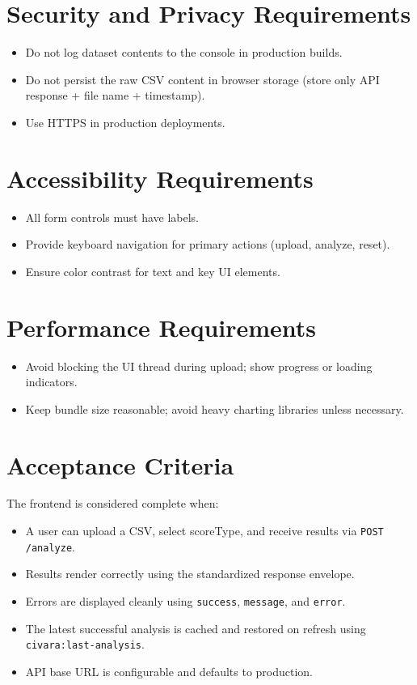 \documentclass[12pt,a4paper]{article}
\begin{document}
\section{Security and Privacy Requirements}

\begin{itemize}
    \item Do not log dataset contents to the console in production builds.
    \item Do not persist the raw CSV content in browser storage (store only API response + file name + timestamp).
    \item Use HTTPS in production deployments.
\end{itemize}

\section{Accessibility Requirements}

\begin{itemize}
    \item All form controls must have labels.
    \item Provide keyboard navigation for primary actions (upload, analyze, reset).
    \item Ensure color contrast for text and key UI elements.
\end{itemize}

\section{Performance Requirements}

\begin{itemize}
    \item Avoid blocking the UI thread during upload; show progress or loading indicators.
    \item Keep bundle size reasonable; avoid heavy charting libraries unless necessary.
\end{itemize}

\section{Acceptance Criteria}

The frontend is considered complete when:
\begin{itemize}
    \item A user can upload a CSV, select scoreType, and receive results via \texttt{POST /analyze}.
    \item Results render correctly using the standardized response envelope.
    \item Errors are displayed cleanly using \texttt{success}, \texttt{message}, and \texttt{error}.
    \item The latest successful analysis is cached and restored on refresh using \texttt{civara:last-analysis}.
    \item API base URL is configurable and defaults to production.
\end{itemize}
\end{document}
